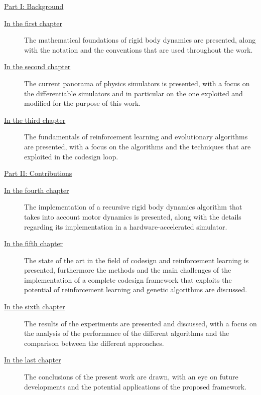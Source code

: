 \begin{description}

    \item{\hyperref[part:background]{Part I: Background}}

          \begin{description}
              \item[{\hyperref[chp:back_RBDynamics]{In the first chapter}}] The mathematical foundations of rigid body dynamics are presented, along with the notation and the conventions that are used throughout the work.
              \item[{\hyperref[chp:back_PhysicsSimulators]{In the second chapter}}] The current panorama of physics simulators is presented, with a focus on the differentiable simulators and in particular on the one exploited and modified for the purpose of this work.
              \item [{\hyperref[chp:back_RLGA]{In the third chapter}}] The fundamentals of reinforcement learning and evolutionary algorithms are presented, with a focus on the algorithms and the techniques that are exploited in the codesign loop.
          \end{description}

    \item{\hyperref[part:contributions]{Part II: Contributions}}

          \begin{description}
              \item[{\hyperref[chp:contrib_ABA]{In the fourth chapter}}] The implementation of a recursive rigid body dynamics algorithm that takes into account motor dynamics is presented, along with the details regarding its implementation in a hardware-accelerated simulator.
              \item[{\hyperref[chp:contrib_CodesignRL]{In the fifth chapter}}] The state of the art in the field of codesign and reinforcement learning is presented, furthermore the methods and the main challenges of the implementation of a complete codesign framework that exploits the potential of reinforcement learning and genetic algorithms are discussed.
              \item[{\hyperref[chp:contrib_ResultsDiscussion]{In the sixth chapter}}] The results of the experiments are presented and discussed, with a focus on the analysis of the performance of the different algorithms and the comparison between the different approaches.
              \item[{\hyperref[chp:contrib_Conclusions]{In the last chapter}}] The conclusions of the present work are drawn, with an eye on future developments and the potential applications of the proposed framework.
          \end{description}
\end{description}